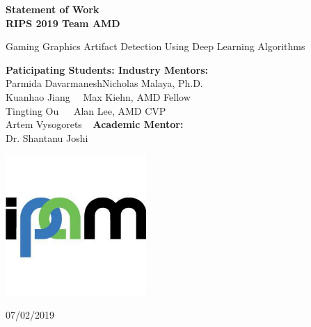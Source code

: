 \documentclass[12pt]{article}
\begin{document}




\begin{titlepage}
    \begin{center}
        \vspace*{1cm}
 
        \Huge
        \textbf{Statement of Work\\RIPS 2019 Team AMD}
 
        \vspace{2cm}
        
        Gaming Graphics Artifact Detection Using Deep Learning Algorithms\\
        
        \vspace{2cm}
        
        \begin{flushleft}
        \small
        \textbf{Paticipating Students: \qquad \qquad\qquad \qquad \qquad \qquad \qquad \qquad  Industry Mentors:\\}
            Parmida Davarmanesh\qquad \qquad \qquad \qquad \qquad \qquad \qquad \qquad \qquad \qquad Nicholas Malaya, Ph.D.\\
            Kuanhao Jiang \qquad \qquad\qquad\qquad \qquad \qquad \qquad \qquad \qquad \qquad \qquad$\>\>\>$ Max Kiehn, AMD Fellow\\
            Tingting Ou \qquad \qquad\qquad\qquad\qquad\qquad \qquad \qquad \qquad \qquad \qquad \quad $\>\>\>\>$ Alan Lee, AMD CVP \\
            Artem Vysogorets  \qquad \qquad\qquad\qquad\qquad\qquad \qquad \quad \qquad \qquad \qquad $\>\>$ \textbf{Academic Mentor:\\}
        \qquad \qquad\qquad\qquad \qquad \qquad \qquad \qquad \qquad  \qquad \qquad \qquad \qquad \qquad \qquad   Dr. Shantanu Joshi\\
        \end{flushleft}
 
 
        

        
 
        \vspace{1.5cm}
 
     
 
        \vfill
 
       
        \includegraphics[width=0.4\textwidth]{ipam.jpeg}
 
        \Large
        07/02/2019
 
    \end{center}
\end{titlepage}
\end{document}
